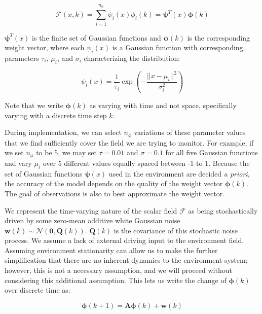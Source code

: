 \begin{equation}
    \mathcal{F}(x,k)=\sum_{i=1}^{n_\phi}\psi_i(x)\phi_i(k)=\bm{\psi}^T(x)\bm{\phi}(k)
    \label{eq:scalar-field-def}
\end{equation}

$\bm{\psi}^T(x)$ is the finite set of Gaussian functions and $\bm{\phi}(k)$ is the corresponding weight vector, where each $\psi_i(x)$ is a Gaussian function with corresponding parameters $\tau_i$, $\mu_i$, and $\sigma_i$ characterizing the distribution:

\begin{equation}
    \psi_i(x) = \frac{1}{\tau_i}\exp\left(-\frac{||x-\mu_i||^2}{\sigma_i^2}\right)
    \label{eq:gaussian-function-characterization}
\end{equation}

Note that we write $\bm{\phi}(k)$ as varying with time and not space, specifically varying with a discrete time step $k$.

During implementation, we can select $n_{\phi}$ variations of these parameter values that we find sufficiently cover the field we are trying to monitor. For example, if we set $n_{\phi}$ to be 5, we may set $\tau=0.01$ and $\sigma=0.1$ for all five Gaussian functions and vary $\mu_i$ over 5 different values equally spaced between -1 to 1. Because the set of Gaussian functions $\bm{\psi}(x)$ used in the environment are decided \textit{a priori}, the accuracy of the model depends on the quality of the weight vector $\bm{\phi}(k)$. The goal of observations is also to best approximate the weight vector.

We represent the time-varying nature of the scalar field $\mathcal{F}$ as being stochastically driven by some zero-mean additive white Gaussian noise $\mathbf{w}(k)\sim\mathcal{N}(\mathbf{0},\mathbf{Q}(k))$. $\mathbf{Q}(k)$ is the covariance of this stochastic noise process. We assume a lack of external driving input to the environment field. Assuming environment stationarity can allow us to make the further simplification that there are no inherent dynamics to the environment system; however, this is not a necessary assumption, and we will proceed without considering this additional assumption. This lets us write the change of $\bm{\phi}(k)$ over discrete time as:

\begin{equation}
    \bm{\phi}(k+1) = \mathbf{A}\bm{\phi}(k) + \mathbf{w}(k)
    \label{eq:field-weights-linear-update}
\end{equation}

